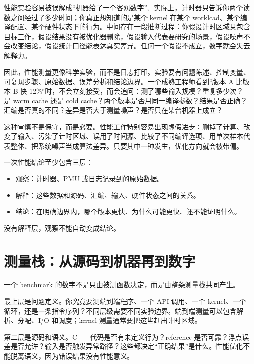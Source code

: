 性能实验容易被误解成“机器给了一个客观数字”。实际上，计时器只告诉你两个读数之间经过了多少时间；你真正想知道的是某个 kernel 在某个 workload、某个编译配置、某个硬件状态下的行为。中间存在一段推断过程：你假设计时区域只包含目标工作，假设结果没有被优化器删除，假设输入代表要研究的场景，假设噪声不会改变结论，假设统计口径能表达真实差异。任何一个假设不成立，数字就会失去解释力。

因此，性能测量更像科学实验，而不是日志打印。实验要有问题陈述、控制变量、可复现步骤、原始数据、误差分析和结论边界。一个成熟工程师看到“版本 A 比版本 B 快 12\%”时，不会立刻接受，而会追问：测了哪些输入规模？重复多少次？是 warm cache 还是 cold cache？两个版本是否用同一编译参数？结果是否正确？汇编是否真的不同？差异是否大于测量噪声？是否只在某台机器上成立？

这种审慎不是保守，而是必要。性能工作特别容易出现虚假进步：删掉了计算、改变了输入、污染了计时区域、误用了时间源、比较了不同编译选项、用单次样本代表整体、把系统噪声当成算法差异。只要其中一种发生，优化方向就会被带偏。

\begin{mentalmodel}
一次性能结论至少包含三层：

\begin{itemize}
  \item 观察：计时器、PMU 或日志记录到的原始数据。
  \item 解释：这些数据和源码、汇编、输入、硬件状态之间的关系。
  \item 结论：在明确边界内，哪个版本更快、为什么可能更快、还不能证明什么。
\end{itemize}

没有解释层，观察不能自动变成结论。
\end{mentalmodel}

\section{测量栈：从源码到机器再到数字}

一个 benchmark 的数字不是只由被测函数决定，而是由整条测量栈共同产生。

最上层是问题定义。你究竟要测端到端程序、一个 API 调用、一个 kernel、一个循环，还是一条指令序列？不同层级需要不同实验边界。端到端测量可以包含解析、分配、I/O 和调度；kernel 测量通常要把这些赶出计时区域。

第二层是源码和语义。C++ 代码是否有未定义行为？reference 是否可靠？浮点误差是否允许？输入是否触发异常路径？这些都决定“正确结果”是什么。性能优化不能脱离语义，因为错误结果没有性能意义。

